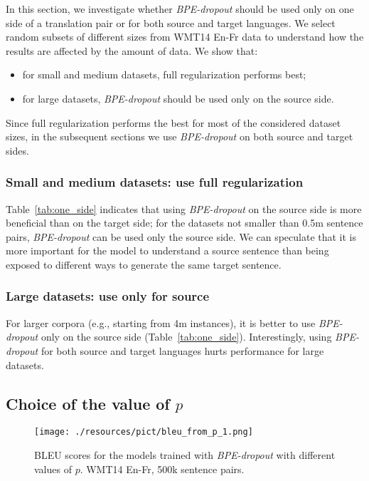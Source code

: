 \documentclass[11pt,a4paper]{article}
\begin{document}
In this section, we investigate whether \textit{BPE-dropout} should be used only on one side of a translation pair or for both source and target languages. We select random subsets of different sizes from WMT14 En-Fr data to understand how the results are affected by the amount of data. We show that:
\begin{itemize}
    \item for small and medium datasets, full regularization performs best;
    \item for large datasets, \textit{BPE-dropout} should be used only on the source side.
\end{itemize}

Since full regularization performs the best for most of the considered dataset sizes, in the subsequent sections we use \textit{BPE-dropout} on both source and target sides.


\subsubsection{Small and medium datasets: use full regularization}

Table~\ref{tab:one_side} indicates that using \textit{BPE-dropout} on the source side is more beneficial than on the target side; for the datasets not smaller than 0.5m sentence pairs, \textit{BPE-dropout} can be used only the source side. We can speculate that it is more important for the model to understand a source sentence than being exposed to different ways to generate the same target sentence.


\subsubsection{Large datasets: use only for source}

For larger corpora (e.g., starting from 4m instances),  it is better to use \textit{BPE-dropout} only on the source side (Table~\ref{tab:one_side}). Interestingly, using \textit{BPE-dropout} for both source and target languages hurts performance for large datasets.





\subsection{Choice of the value of $p$}
\label{sect:choice_of_p}

\begin{figure}[t!]
    \centering
    \texttt{[image: ./resources/pict/bleu\_from\_p\_1.png]}
    \caption{BLEU scores for the models trained with \textit{BPE-dropout} with different values of $ p $. WMT14 En-Fr, 500k sentence pairs.}
    \label{fig:drop_grid}
\end{figure}
\end{document}

